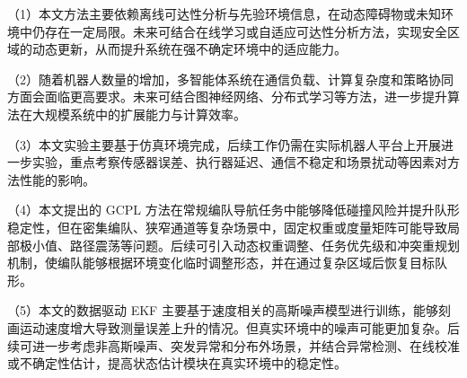 （1）本文方法主要依赖离线可达性分析与先验环境信息，在动态障碍物或未知环境中仍存在一定局限。未来可结合在线学习或自适应可达性分析方法，实现安全区域的动态更新，从而提升系统在强不确定环境中的适应能力。

（2）随着机器人数量的增加，多智能体系统在通信负载、计算复杂度和策略协同方面会面临更高要求。未来可结合图神经网络、分布式学习等方法，进一步提升算法在大规模系统中的扩展能力与计算效率。

（3）本文实验主要基于仿真环境完成，后续工作仍需在实际机器人平台上开展进一步实验，重点考察传感器误差、执行器延迟、通信不稳定和场景扰动等因素对方法性能的影响。

（4）本文提出的 GCPL 方法在常规编队导航任务中能够降低碰撞风险并提升队形稳定性，但在密集编队、狭窄通道等复杂场景中，固定权重或度量矩阵可能导致局部极小值、路径震荡等问题。后续可引入动态权重调整、任务优先级和冲突重规划机制，使编队能够根据环境变化临时调整形态，并在通过复杂区域后恢复目标队形。

（5）本文的数据驱动 EKF 主要基于速度相关的高斯噪声模型进行训练，能够刻画运动速度增大导致测量误差上升的情况。但真实环境中的噪声可能更加复杂。后续可进一步考虑非高斯噪声、突发异常和分布外场景，并结合异常检测、在线校准或不确定性估计，提高状态估计模块在真实环境中的稳定性。